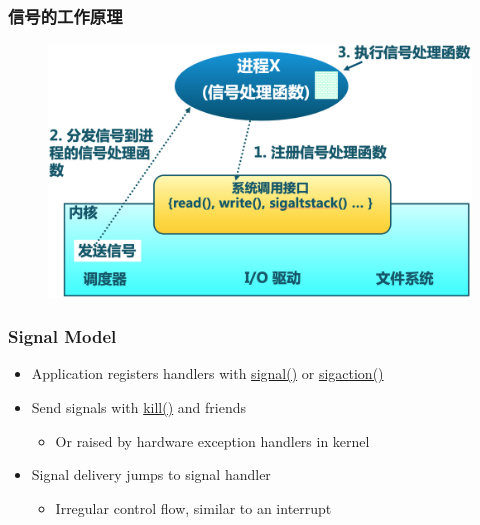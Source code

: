 \begin{frame}[fragile]
    \frametitle{信号的工作原理}

    \begin{figure}
        \centering
        \includegraphics[width=0.8\linewidth]{figs/signal-method.png}
    \end{figure}

\end{frame}
\begin{frame}[fragile]
    \frametitle{Signal Model}
    \begin{itemize}
        \item Application registers handlers with \href{https://man7.org/linux/man-pages/man2/signal.2.html}{signal()} or \href{https://www.man7.org/linux/man-pages/man2/sigaction.2.html}{sigaction()} \pause
        \item Send signals with \href{https://man7.org/linux/man-pages/man2/kill.2.html}{kill()} and friends
        \begin{itemize}
            \item Or raised by hardware exception handlers in kernel
        \end{itemize} \pause
        \item Signal delivery jumps to signal handler
        \begin{itemize}
            \item Irregular control flow, similar to an interrupt
        \end{itemize}
    \end{itemize}
\end{frame}
% 
